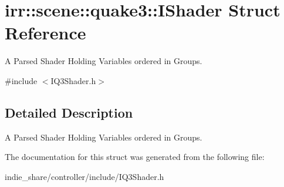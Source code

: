 \hypertarget{structirr_1_1scene_1_1quake3_1_1IShader}{}\section{irr\+:\+:scene\+:\+:quake3\+:\+:I\+Shader Struct Reference}
\label{structirr_1_1scene_1_1quake3_1_1IShader}


A Parsed Shader Holding Variables ordered in Groups.  




{\ttfamily \#include $<$I\+Q3\+Shader.\+h$>$}



\subsection{Detailed Description}
A Parsed Shader Holding Variables ordered in Groups. 

The documentation for this struct was generated from the following file\+:\begin{DoxyCompactItemize}
\item 
indie\+\_\+share/controller/include/I\+Q3\+Shader.\+h\end{DoxyCompactItemize}
